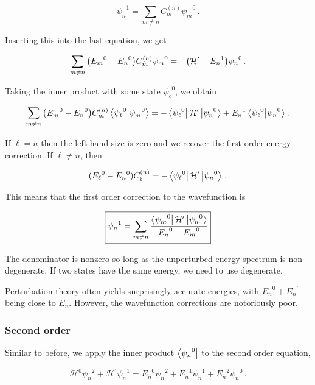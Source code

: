 \documentclass[12pt, titlepage]{article}
\begin{document}
\begin{equation}
{\psi_n}^{1} = \sum_{m \neq n}C_{m}^{(n)}{\psi_m}^0 \,.
\end{equation}

Inserting this into the last equation, we get

\begin{equation*}
	\sum_{m \neq n}\qty({E_m}^0 - {E_n}^0)C_{m}^{(n)}{\psi_m}^0 = -\qty(\mathcal{H}^\prime - {E_n}^1){\psi_n}^0 \,.
\end{equation*}

Taking the inner product with some state ${\psi_\ell}^0$, we obtain

\begin{equation*}
	\sum_{m \neq n}\qty({E_m}^0 - {E_n}^0)C_{m}^{(n)}\bra{{\psi_\ell}^0}\ket{{\psi_m}^0} = -\bra{{\psi_\ell}^0}\mathcal{H}^{\prime}\ket{{\psi_n}^0} + {E_n}^1\bra{{\psi_\ell}^0}\ket{{\psi_n}^0} \,.
\end{equation*}

If $\ell = n$ then the left hand size is zero and we recover the first order energy correction. If $\ell \neq n$, then

\begin{equation*}
	({E_\ell}^0 - {E_n}^0)C_{\ell}^{(n)} = -\bra{{\psi_\ell}^0}\mathcal{H}^\prime\ket{{\psi_n}^0} \,.
\end{equation*}

This means that the first order correction to the wavefunction is

\begin{equation}
	\boxed{{\psi_ n}^1 = \sum_{m \neq n}\frac{\bra{{\psi_m}^0}\mathcal{H}^\prime\ket{{\psi_n}^0}}{{E_n}^0 - {E_m}^0}}
\end{equation}

The denominator is nonzero so long as the unperturbed energy spectrum is non-degenerate. If two states have the same energy, we need to use degenerate.

Perturbation theory often yields surprisingly accurate energies, with ${E_n}^0 + {E_n}^\prime$ being close to $E_n$. However, the wavefunction corrections are notoriously poor.

\subsubsection{Second order}
Similar to before, we apply the inner product $\bra{{\psi_n}^0}$ to the second order equation,

\begin{equation*}
	\mathcal{H}^0{\psi_n}^2 + \mathcal{H}^{\prime}{\psi_n}^1 = {E_n}^0{\psi_n}^2 + {E_n}^1{\psi_n}^1 + {E_n}^2{\psi_n}^0 \,.
\end{equation*}
\end{document}
